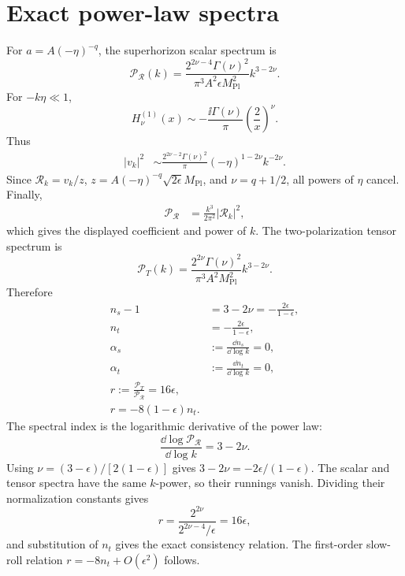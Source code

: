 \section{Exact power-law spectra}
For \(a=A(-\eta)^{-q}\), the superhorizon scalar spectrum is
\begin{equation}
\boxed{
\mathcal P_{\mathcal R}(k)
=
\frac{2^{2\nu-4}\Gamma(\nu)^2}
{\pi^3A^2\epsilon M_{\mathrm{Pl}}^2}
 k^{3-2\nu}.
}
\end{equation}
For \(-k\eta\ll1\),
\begin{equation}
H_\nu^{(1)}(x)
\sim
-\frac{\ii\Gamma(\nu)}{\pi}
\left(\frac2x\right)^\nu.
\end{equation}
Thus
\begin{align}
|v_k|^2
&\sim
\frac{2^{2\nu-2}\Gamma(\nu)^2}{\pi}
(-\eta)^{1-2\nu}k^{-2\nu}.
\end{align}
Since \(\mathcal R_k=v_k/z\), \(z=A(-\eta)^{-q}\sqrt{2\epsilon}M_{\mathrm{Pl}}\), and
\(\nu=q+1/2\), all powers of \(\eta\) cancel.  Finally,
\begin{align}
\mathcal P_{\mathcal R}
&=\frac{k^3}{2\pi^2}|\mathcal R_k|^2,
\end{align}
which gives the displayed coefficient and power of \(k\).
The two-polarization tensor spectrum is
\begin{equation}
\boxed{
\mathcal P_T(k)
=
\frac{2^{2\nu}\Gamma(\nu)^2}
{\pi^3A^2M_{\mathrm{Pl}}^2}
 k^{3-2\nu}.
}
\end{equation}
Therefore
\begin{align}
n_s-1&=3-2\nu=-\frac{2\epsilon}{1-\epsilon},\\
n_t&=-\frac{2\epsilon}{1-\epsilon},\\
\alpha_s&:=\frac{\dd n_s}{\dd\log k}=0,\\
\alpha_t&:=\frac{\dd n_t}{\dd\log k}=0,\\
\boxed{r:=\frac{\mathcal P_T}{\mathcal P_{\mathcal R}}=16\epsilon},\\
\boxed{r=-8(1-\epsilon)n_t}.
\end{align}
The spectral index is the logarithmic derivative of the power law:
\begin{equation}
\frac{\dd\log\mathcal P_{\mathcal R}}{\dd\log k}
=3-2\nu.
\end{equation}
Using
\(\nu=(3-\epsilon)/[2(1-\epsilon)]\) gives
\(3-2\nu=-2\epsilon/(1-\epsilon)\).  The scalar and tensor spectra have the same \(k\)-power, so their runnings vanish.  Dividing their normalization constants gives
\begin{equation}
r
=
\frac{2^{2\nu}}{2^{2\nu-4}/\epsilon}
=16\epsilon,
\end{equation}
and substitution of \(n_t\) gives the exact consistency relation.
The first-order slow-roll relation \(r=-8n_t+O(\epsilon^2)\) follows.

